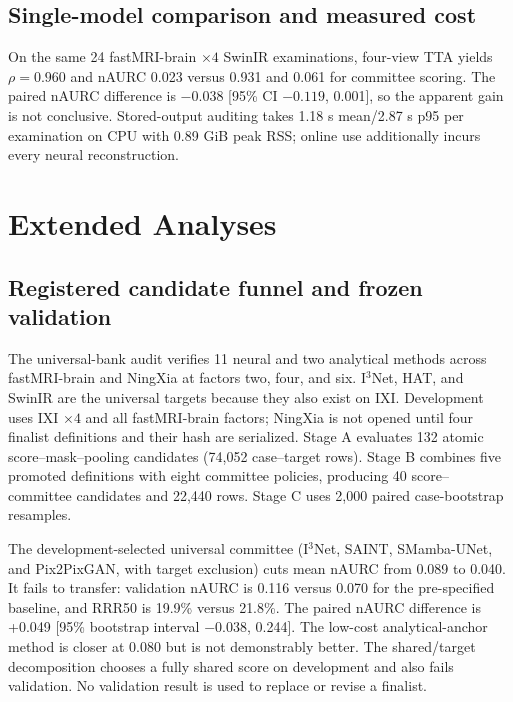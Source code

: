 \documentclass{article}
\begin{document}
\subsection{Single-model comparison and measured cost}
On the same 24 fastMRI-brain $\times4$ SwinIR examinations, four-view TTA yields $\rho=0.960$ and nAURC 0.023 versus 0.931 and 0.061 for committee scoring. The paired nAURC difference is $-0.038$ [95\% CI $-0.119$, 0.001], so the apparent gain is not conclusive. Stored-output auditing takes 1.18 s mean/2.87 s p95 per examination on CPU with 0.89 GiB peak RSS; online use additionally incurs every neural reconstruction.

\clearpage
\section{Extended Analyses}
\subsection{Registered candidate funnel and frozen validation}
The universal-bank audit verifies 11 neural and two analytical methods across fastMRI-brain and NingXia at factors two, four, and six. I$^3$Net, HAT, and SwinIR are the universal targets because they also exist on IXI. Development uses IXI $\times4$ and all fastMRI-brain factors; NingXia is not opened until four finalist definitions and their hash are serialized. Stage A evaluates 132 atomic score--mask--pooling candidates (74,052 case--target rows). Stage B combines five promoted definitions with eight committee policies, producing 40 score--committee candidates and 22,440 rows. Stage C uses 2,000 paired case-bootstrap resamples.

\begin{table}[H]
 \centering
 \caption{Frozen finalists on development profiles. Worst is maximum profile nAURC.}
 \resizebox{\columnwidth}{!}{}
 \label{tab:optdev}
\end{table}

\begin{table}[H]
 \centering
 \caption{One-shot NingXia OOF validation averaged over three targets.}
 \resizebox{\columnwidth}{!}{}
 \label{tab:optval}
\end{table}

The development-selected universal committee (I$^3$Net, SAINT, SMamba-UNet, and Pix2PixGAN, with target exclusion) cuts mean nAURC from 0.089 to 0.040. It fails to transfer: validation nAURC is 0.116 versus 0.070 for the pre-specified baseline, and RRR50 is 19.9\% versus 21.8\%. The paired nAURC difference is +0.049 [95\% bootstrap interval $-0.038$, 0.244]. The low-cost analytical-anchor method is closer at 0.080 but is not demonstrably better. The shared/target decomposition chooses a fully shared score on development and also fails validation. No validation result is used to replace or revise a finalist.
\end{document}
